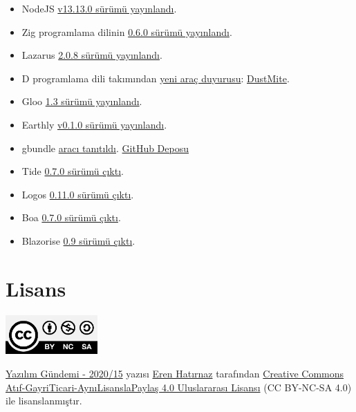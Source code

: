 \documentclass[11pt]{article}
\begin{document}
\begin{itemize}
\item NodeJS \href{https://nodejs.org/en/blog/release/v13.13.0/}{v13.13.0 sürümü yayınlandı}.
\item Zig programlama dilinin \href{https://ziglang.org/download/0.6.0/release-notes.html\#Target-Details}{0.6.0 sürümü yayınlandı}.
\item Lazarus \href{https://forum.lazarus.freepascal.org/index.php?topic=49356.0}{2.0.8 sürümü yayınlandı}.
\item D programlama dili takımından \href{https://dlang.org/blog/2020/04/13/dustmite-the-general-purpose-data-reduction-tool/}{yeni araç duyurusu}: \href{https://github.com/CyberShadow/DustMite}{DustMite}.
\item Gloo \href{https://www.solo.io/blog/announcing-gloo-1-3-developer-portal-extensibility-performance-and-usability/}{1.3 sürümü yayınlandı}.
\item Earthly \href{https://github.com/vladaionescu/earthly/releases/tag/v0.1.0}{v0.1.0 sürümü yayınlandı}.
\item gbundle \href{https://interrupt.memfault.com/blog/gdbundle-plugin-manager}{aracı tanıtıldı}. \href{https://github.com/memfault/gdbundle}{GitHub Deposu}
\item Tide \href{https://github.com/http-rs/tide/releases/tag/v0.7.0}{0.7.0 sürümü çıktı}.
\item Logos \href{https://github.com/maciejhirsz/logos/releases/tag/v0.11.0}{0.11.0 sürümü çıktı}.
\item Boa \href{https://github.com/jasonwilliams/boa/releases/tag/v0.7.0}{0.7.0 sürümü çıktı}.
\item Blazorise \href{https://blazorise.com/news/release-notes/090/}{0.9 sürümü çıktı}.
\end{itemize}
\section{Lisans}
\label{sec:orga2053b4}
\begin{center}
\begin{center}
\includegraphics[height=1.5cm]{../../../img/CC_BY-NC-SA_4.0.png}
\end{center}

\href{yazilim-gundemi-2020-15.pdf}{Yazılım Gündemi - 2020/15} yazısı \href{https://erenhatirnaz.github.io}{Eren Hatırnaz} tarafından \href{http://creativecommons.org/licenses/by-nc-sa/4.0/}{Creative Commons
Atıf-GayriTicari-AynıLisanslaPaylaş 4.0 Uluslararası Lisansı} (CC BY-NC-SA 4.0)
ile lisanslanmıştır.
\end{center}
\end{document}
